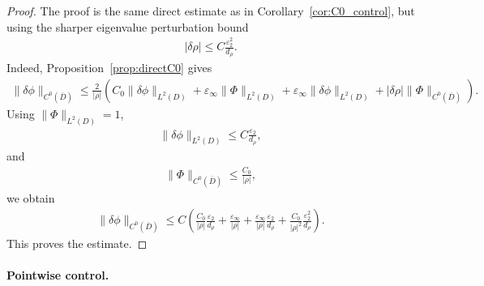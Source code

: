 \documentclass[10pt]{article}
\numberwithin{equation}{section}
\begin{document}
\begin{proof}
The proof is the same direct estimate as in Corollary~\ref{cor:C0_control}, but using the sharper eigenvalue perturbation bound
\begin{align*}
    |\delta\rho|
    \leq
    C\frac{\varepsilon_2^2}{d_\rho}.
\end{align*}
Indeed, Proposition~\ref{prop:directC0} gives
\begin{align*}
    \|\delta\phi\|_{C^0(\overline D)}
    \leq
    \frac{2}{|\rho|}
    \left(
    C_0\|\delta\phi\|_{L^2(D)}
    +
    \varepsilon_\infty\|\Phi\|_{L^2(D)}
    +
    \varepsilon_\infty\|\delta\phi\|_{L^2(D)}
    +
    |\delta\rho|\|\Phi\|_{C^0(\overline D)}
    \right).
\end{align*}
Using \(\|\Phi\|_{L^2(D)}=1\),
\begin{align*}
    \|\delta\phi\|_{L^2(D)}
    \leq
    C\frac{\varepsilon_2}{d_\rho},
\end{align*}
and
\begin{align*}
    \|\Phi\|_{C^0(\overline D)}
    \leq
    \frac{C_0}{|\rho|},
\end{align*}
we obtain
\begin{align*}
    \|\delta\phi\|_{C^0(\overline D)}
    \leq
    C\left(
    \frac{C_0}{|\rho|}\frac{\varepsilon_2}{d_\rho}
    +
    \frac{\varepsilon_\infty}{|\rho|}
    +
    \frac{\varepsilon_\infty}{|\rho|}\frac{\varepsilon_2}{d_\rho}
    +
    \frac{C_0}{|\rho|^2}\frac{\varepsilon_2^2}{d_\rho}
    \right).
\end{align*}
This proves the estimate.
\end{proof}






\paragraph*{Pointwise control.}
\end{document}
